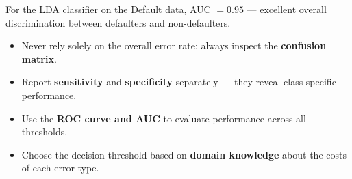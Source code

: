 \documentclass[11pt,a4paper]{article}
\theoremstyle{definition}
\theoremstyle{plain}
\theoremstyle{remark}
\begin{document}
For the LDA classifier on the Default data, AUC $= \mathbf{0.95}$ — excellent overall discrimination between defaulters and non-defaulters.

\begin{tcolorbox}[colback=green!5!white,colframe=green!75!black,title=\textbf{Key Takeaways for Classifier Evaluation}]
\begin{itemize}
    \item Never rely solely on the overall error rate: always inspect the \textbf{confusion matrix}.
    \item Report \textbf{sensitivity} and \textbf{specificity} separately — they reveal class-specific performance.
    \item Use the \textbf{ROC curve and AUC} to evaluate performance across all thresholds.
    \item Choose the decision threshold based on \textbf{domain knowledge} about the costs of each error type.
\end{itemize}
\end{tcolorbox}
\end{document}
